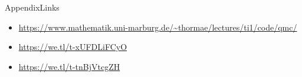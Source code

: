 \begin{frame}[allowframebreaks]{Appendix}{Links}
  \begin{itemize}
    \item \url{https://www.mathematik.uni-marburg.de/~thormae/lectures/ti1/code/qmc/}
    \item \url{https://we.tl/t-xUFDLiFCyO}
    \item \url{https://we.tl/t-tnBjVtcgZH}
  \end{itemize}
\end{frame}
